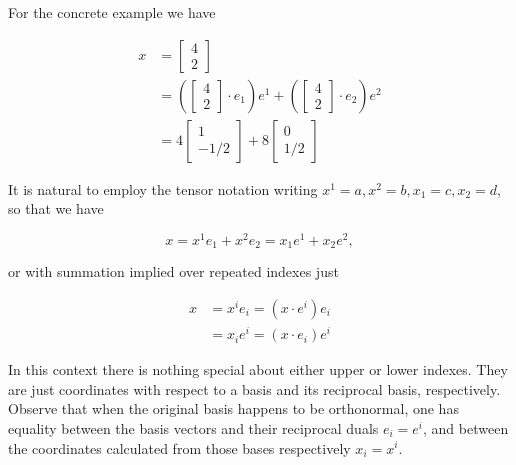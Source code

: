 \documentclass[iop,tighten]{emulateapj}
\begin{document}
For the concrete example we have

\begin{equation}\label{eqn:grahamSchmidtLorentz:290}
\begin{aligned}
x 
&= 
\begin{bmatrix}
4 \\
2
\end{bmatrix} \\
&=
\left(
\begin{bmatrix}
4 \\
2
\end{bmatrix} 
\cdot e_1
\right)
e^1
+
\left(
\begin{bmatrix}
4 \\
2
\end{bmatrix} 
\cdot e_2
\right)
e^2 \\
&= 4 
\begin{bmatrix}
1 \\
-1/2
\end{bmatrix} 
+ 
8
\begin{bmatrix}
0 \\
1/2
\end{bmatrix}
\end{aligned}
\end{equation}

It is natural to employ the tensor notation writing $x^1 = a, x^2 = b, x_1 = c, x_2 = d$, so that we have

\begin{equation}\label{eqn:grahamSchmidtLorentz:310}
x = x^1 e_1 + x^2 e_2 = x_1 e^1 + x_2 e^2,
\end{equation}

or with summation implied over repeated indexes just

\begin{equation}\label{eqn:grahamSchmidtLorentz:330}
\begin{aligned}
x &= x^i e_i = (x \cdot e^i) e_i \\
  &= x_i e^i = (x \cdot e_i) e^i
\end{aligned}
\end{equation}

In this context there is nothing special about either upper or lower indexes.  They are just coordinates with respect to a basis and its reciprocal basis, respectively.  Observe that when the original basis happens to be orthonormal, one has equality between the basis vectors and their reciprocal duals $e_i = e^i$, and between the coordinates calculated from those bases respectively $x_i = x^i$.
\end{document}
